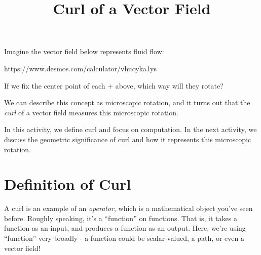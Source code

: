 \documentclass{ximera}
\title{Curl of a Vector Field}
\begin{document}
  
\begin{abstract}  
\end{abstract}  
\maketitle 


Imagine the vector field below represents fluid flow:


https://www.desmos.com/calculator/vhuoyka1ys


If we fix the center point of each $+$ above, which way will they rotate? 

We can describe this concept as microscopic rotation, and it turns out that the \emph{curl} of a vector field measures this microscopic rotation.

In this activity, we define curl and focus on computation. In the next activity, we discuss the geometric significance of curl and how it represents this microscopic rotation.

\section{Definition of Curl}

A curl is an example of an \emph{operator}, which is a mathematical object you've seen before. Roughly speaking, it's a ``function'' on functions. That is, it takes a function as an input, and produces a function as an output. Here, we're using ``function'' very broadly - a function could be scalar-valued, a path, or even a vector field!
\end{document}
